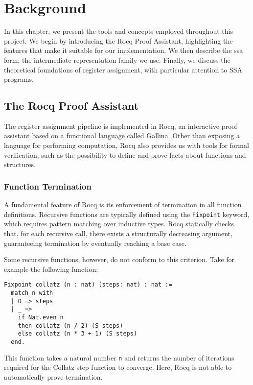 
\chapter{Background}
\label{cha:background}

In this chapter, we present the tools and concepts employed throughout this project. We begin by introducing the Rocq Proof Assistant, highlighting the features that make it suitable for our implementation. We then describe the \gls{ssa} form, the intermediate representation family we use. Finally, we discuss the theoretical foundations of register assignment, with particular attention to SSA programs.

\section{The Rocq Proof Assistant}

The register assignment pipeline is implemented in Rocq, an interactive proof assistant based on a functional language called Gallina. Other than exposing a language for performing computation, Rocq also provides us with tools for formal verification, such as the possibility to define and prove facts about functions and structures.

\subsection{Function Termination}
\label{subsec:funterm}

A fundamental feature of Rocq is its enforcement of termination in all function definitions. Recursive functions are typically defined using the \texttt{Fixpoint} keyword, which requires pattern matching over inductive types. Rocq statically checks that, for each recursive call, there exists a structurally decreasing argument, guaranteeing termination by eventually reaching a base case.

Some recursive functions, however, do not conform to this criterion. Take for example the following function:

\begin{lstlisting}[style=Rocq]
Fixpoint collatz (n : nat) (steps: nat) : nat :=
  match n with
  | O => steps
  | _ =>
    if Nat.even n
    then collatz (n / 2) (S steps)
    else collatz (n * 3 + 1) (S steps)
  end.
\end{lstlisting}

This function takes a natural number \texttt n and returns the number of iterations required for the Collatz step function to converge. Here, Rocq is not able to automatically prove termination.

